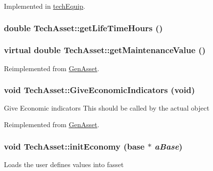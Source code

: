 Implemented in \hyperlink{classtech_equip_ad9c0cb0fabe3820710f162991bcd7e9a}{techEquip}.\hypertarget{class_tech_asset_acd60c183245533ce575098c7061f2d7b}{
\subsubsection[{getLifeTimeHours}]{\setlength{\rightskip}{0pt plus 5cm}double TechAsset::getLifeTimeHours ()}}
\label{class_tech_asset_acd60c183245533ce575098c7061f2d7b}
\hypertarget{class_tech_asset_a72e1db80b26fc920318a3f98ec814b06}{
\subsubsection[{getMaintenanceValue}]{\setlength{\rightskip}{0pt plus 5cm}virtual double TechAsset::getMaintenanceValue ()}}
\label{class_tech_asset_a72e1db80b26fc920318a3f98ec814b06}


Reimplemented from \hyperlink{class_gen_asset_a702f6a8396de589c119a24aede39a930}{GenAsset}.\hypertarget{class_tech_asset_ac7681ccf18e41a30b518f27cbde6a160}{
\subsubsection[{GiveEconomicIndicators}]{\setlength{\rightskip}{0pt plus 5cm}void TechAsset::GiveEconomicIndicators (void)}}
\label{class_tech_asset_ac7681ccf18e41a30b518f27cbde6a160}
Give Economic indicators This should be called by the actual object 

Reimplemented from \hyperlink{class_gen_asset_a278eca323c1cf1bace458cda1103ac15}{GenAsset}.\hypertarget{class_tech_asset_a405c511686ff6c8051ee748db53cd045}{
\subsubsection[{initEconomy}]{\setlength{\rightskip}{0pt plus 5cm}void TechAsset::initEconomy ({\bf base} $\ast$ {\em aBase})}}
\label{class_tech_asset_a405c511686ff6c8051ee748db53cd045}
Loads the user defines values into fasset 


